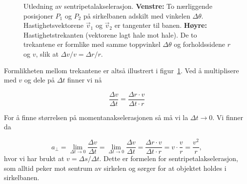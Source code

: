 \begin{figure}[h]
\begin{minipage}[t]{0.46\textwidth}
\end{minipage}
\caption{Utledning av sentripetalakselerasjon.
\textbf{Venstre:} To nærliggende posisjoner $P_1$ og $P_2$ på sirkelbanen adskilt med vinkelen $\Delta\theta$. Hastighetsvektorene $\vec{v}_1$ og $\vec{v}_2$ er tangenter til banen.
\textbf{Høyre:} Hastighetstrekanten (vektorene lagt hale mot hale). De to trekantene er formlike med samme toppvinkel $\Delta\theta$ og forholdssidene $r$ og $v$, slik at $\Delta v/v = \Delta r/r$.}
\label{fig:Sentripetalakselerasjon}
\end{figure}
Formlikheten mellom trekantene er altså illustrert i figur~\ref{fig:Sentripetalakselerasjon}. Ved å multiplisere med $v$ og dele på $\Delta t$ finner vi nå 

\[
    \frac{\Delta v}{\Delta t} = \frac{\Delta r \cdot v}{\Delta t \cdot r}
    \]

For å finne størrelsen på momentanakselerasjonen så må vi la \( \Delta t \to 0 \). Vi finner da 

    \[
    a_\perp = \lim_{\Delta t \to 0} \frac{\Delta v}{\Delta t} = \lim_{\Delta t \to 0} \frac{\Delta v}{\Delta t} = \frac{\Delta r \cdot v}{\Delta t \cdot r}={v}\cdot \frac{v}{r}=\frac{v^2}{r},
    \]
hvor vi har brukt at $v=\Delta s/\Delta t$. Dette er formelen for sentripetalakselerasjon, som alltid peker mot sentrum av sirkelen og sørger for at objektet holdes i sirkelbanen.


